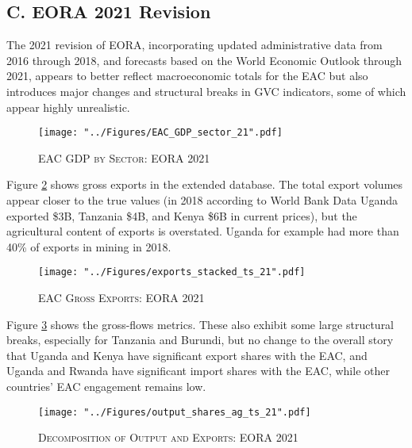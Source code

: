 \documentclass[a4paper]{article}
\begin{document}
\subsection*{C. EORA 2021 Revision}
\setcounter{table}{0}
\renewcommand{\thetable}{C\arabic{table}}
\setcounter{figure}{0}
\renewcommand{\thefigure}{C\arabic{figure}}

The 2021 revision of EORA, incorporating updated administrative data from 2016 through 2018, and forecasts based on the World Economic Outlook through 2021, appears to better reflect macroeconomic totals for the EAC but also introduces major changes and structural breaks in GVC indicators, some of which appear highly unrealistic. 

\begin{figure}[h!]
\centering
\caption{\label{fig:EAC_GDP_sec_21}\textsc{EAC GDP by Sector: EORA 2021}}
\texttt{[image: "../Figures/EAC\_GDP\_sector\_21".pdf]} %
\end{figure}
\FloatBarrier

Figure \ref{fig:exp21} shows gross exports in the extended database. The total export volumes appear closer to the true values (in 2018 according to World Bank Data Uganda exported \$3B, Tanzania \$4B, and Kenya \$6B in current prices), but the agricultural content of exports is overstated. Uganda for example had more than 40\% of exports in mining in 2018. 

\begin{figure}[h!]
\centering
\caption{\label{fig:exp21}\textsc{EAC Gross Exports: EORA 2021}}
\texttt{[image: "../Figures/exports\_stacked\_ts\_21".pdf]} %
\end{figure}
\FloatBarrier

Figure \ref{fig:outshares_ag_ts_21} shows the gross-flows metrics. These also exhibit some large structural breaks, especially for Tanzania and Burundi, but no change to the overall story that Uganda and Kenya have significant export shares with the EAC, and Uganda and Rwanda have significant import shares with the EAC, while other countries' EAC engagement remains low. 

\begin{figure}[h!] %
\centering
\caption{\label{fig:outshares_ag_ts_21}\textsc{Decomposition of Output and Exports: EORA 2021}}
\texttt{[image: "../Figures/output\_shares\_ag\_ts\_21".pdf]} %
\vspace{-15mm}
\end{figure}
\FloatBarrier
\end{document}
